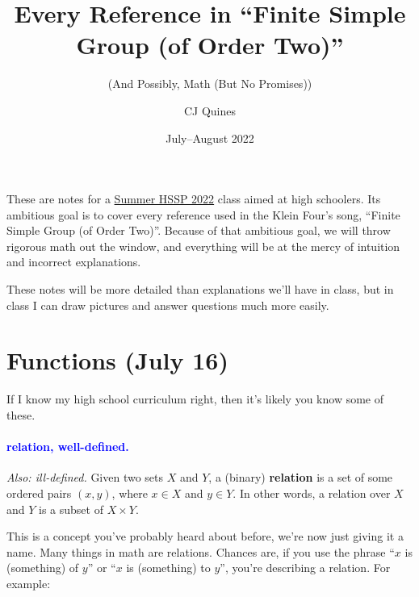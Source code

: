 \documentclass[11pt,paper=letter]{scrartcl}
\renewcommand{\bluebf}[1]{{\bfseries \color{Blue} #1}}
\renewcommand\wp[1]{\paragraph{\textcolor{Blue}{#1.}} \hspace{-1em}}
\newcommand\wl[1]{\label{w:#1}}
\newcommand\oww[1]{\textit{Also: #1.}}
\begin{document}
\title{Every Reference in ``Finite Simple Group (of Order Two)''}
\subtitle{(And Possibly, Math (But No Promises))}
\author{CJ Quines}
\date{July--August 2022}

\maketitle

These are notes for a \href{https://esp.mit.edu/learn/HSSP/2022_Summer/catalog#class_15041}{Summer HSSP 2022} class aimed at high schoolers. Its ambitious goal is to cover every reference used in the Klein Four's song, ``Finite Simple Group (of Order Two)''. Because of that ambitious goal, we will throw rigorous math out the window, and everything will be at the mercy of intuition and incorrect explanations.

These notes will be more detailed than explanations we'll have in class, but in class I can draw pictures and answer questions much more easily.

\section{Functions (July 16)}

If I know my high school curriculum right, then it's likely you know some of these.

\wp{relation, well-defined}
\wl{relation}
\wl{well-defined}
\oww{ill-defined}
Given two sets $X$ and $Y$, a (binary) \bluebf{relation} is a set of some ordered pairs $(x, y)$, where $x \in X$ and $y \in Y$. In other words, a relation over $X$ and $Y$ is a subset of $X \times Y$.

This is a concept you've probably heard about before, we're now just giving it a name. Many things in math are relations. Chances are, if you use the phrase ``$x$ is (something) of $y$'' or ``$x$ is (something) to $y$'', you're describing a relation. For example:
\end{document}
